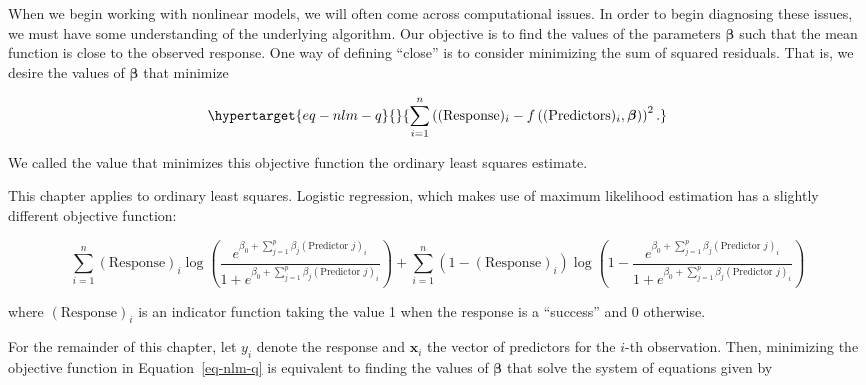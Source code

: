 \documentclass[
  letterpaper,
  DIV=11,
  numbers=noendperiod]{scrreprt}
\theoremstyle{definition}
\theoremstyle{definition}
\theoremstyle{remark}
\begin{document}
When we begin working with nonlinear models, we will often come across
computational issues. In order to begin diagnosing these issues, we must
have some understanding of the underlying algorithm. Our objective is to
find the values of the parameters \(\boldsymbol{\beta}\) such that the
mean function is close to the observed response. One way of defining
``close'' is to consider minimizing the sum of squared residuals. That
is, we desire the values of \(\boldsymbol{\beta}\) that minimize

\begin{equation}\protect\hypertarget{eq-nlm-q}{}{\sum_{i=1}^{n} \left((\text{Response})_i - f\left((\text{Predictors})_i, \boldsymbol{\beta}\right)\right)^2.}\label{eq-nlm-q}\end{equation}

We called the value that minimizes this objective function the ordinary
least squares estimate.

\begin{tcolorbox}[enhanced jigsaw, left=2mm, toprule=.15mm, arc=.35mm, breakable, opacitybacktitle=0.6, opacityback=0, rightrule=.15mm, colbacktitle=quarto-callout-warning-color!10!white, coltitle=black, leftrule=.75mm, toptitle=1mm, colframe=quarto-callout-warning-color-frame, titlerule=0mm, title=\textcolor{quarto-callout-warning-color}{\faExclamationTriangle}\hspace{0.5em}{Warning}, bottomrule=.15mm, colback=white, bottomtitle=1mm]

This chapter applies to ordinary least squares. Logistic regression,
which makes use of maximum likelihood estimation has a slightly
different objective function:

\[\sum_{i=1}^{n} (\text{Response})_i \log\left(\frac{e^{\beta_0 + \sum_{j=1}^{p} \beta_j (\text{Predictor } j)_i}}{1 + e^{\beta_0 + \sum_{j=1}^{p} \beta_j (\text{Predictor } j)_i}}\right) + \sum_{i=1}^{n}\left(1 - (\text{Response})_i\right)\log\left(1 - \frac{e^{\beta_0 + \sum_{j=1}^{p} \beta_j (\text{Predictor } j)_i}}{1 + e^{\beta_0 + \sum_{j=1}^{p} \beta_j (\text{Predictor } j)_i}}\right)\]

where \((\text{Response})_i\) is an indicator function taking the value
1 when the response is a ``success'' and 0 otherwise.

\end{tcolorbox}

For the remainder of this chapter, let \(y_i\) denote the response and
\(\mathbf{x}_i\) the vector of predictors for the \(i\)-th observation.
Then, minimizing the objective function in Equation~\ref{eq-nlm-q} is
equivalent to finding the values of \(\boldsymbol{\beta}\) that solve
the system of equations given by
\end{document}
